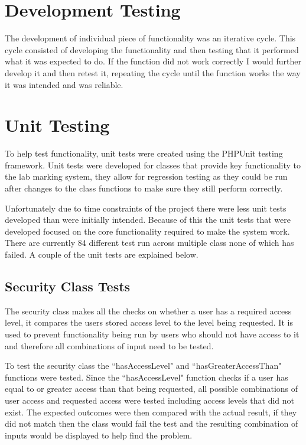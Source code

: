 \documentclass[11pt]{report}
\begin{document}
\section{Development Testing}

The development of individual piece of functionality was an iterative cycle. This cycle consisted of developing the functionality and then testing that it performed what it was expected to do. If the function did not work correctly I would further develop it and then retest it, repeating the cycle until the function works the way it was intended and was reliable. 

\section{Unit Testing}
To help test functionality, unit tests were created using the PHPUnit testing framework. Unit tests were developed for classes that provide key functionality to the lab marking system, they allow for regression testing as they could be run after changes to the class functions to make sure they still perform correctly. 

Unfortunately due to time constraints of the project there were less unit tests developed than were initially intended. Because of this the unit tests that were developed focused on the core functionality required to make the system work. There are currently 84 different test run across multiple class none of which has failed. A couple of the unit tests are explained below.


\subsection{Security Class Tests}

The security class makes all the checks on whether a user has a required access level, it compares the users stored access level to the level being requested. It is used to prevent functionality being run by users who should not have access to it and therefore all combinations of input need to be tested.

To test the security class  the ``hasAccessLevel" and ``hasGreaterAccessThan" functions were tested. Since the ``hasAccessLevel" function checks if a user has equal to or greater access than that being requested, all possible combinations of user access and requested access were tested including access levels that did not exist. The expected outcomes were then compared with the actual result, if they did not match then the class would fail the test and the resulting combination of inputs would be displayed to help find the problem. 
\end{document}
